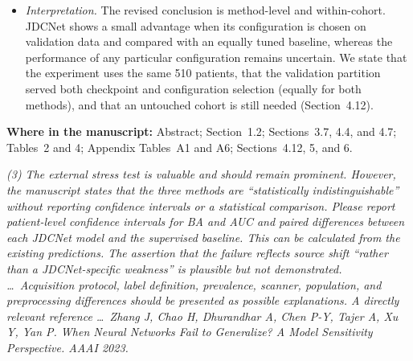 \documentclass[11pt]{article}
\newenvironment{rcomment}{\par\noindent\begin{minipage}{\linewidth}\itshape\color{black!75}}{\end{minipage}\par}
\newcommand{\where}[1]{\par\noindent\textbf{Where in the manuscript:} #1\par}
\begin{document}
\begin{itemize}[leftmargin=1.4em]
\begin{itemize}[leftmargin=1.2em]
    \item \emph{Matched control.} Best-of-16 selection improved the supervised baseline by only $+0.013$ (CI $[-0.011,+0.038]$).
    \item \emph{Training budget.} The batch-size difference identified in our audit is unlikely to explain the result: supervised BA was $0.620$ at batch 128 versus $0.625$ at batch 512.
  \end{itemize}
  \item \emph{Interpretation.} The revised conclusion is method-level and within-cohort. JDCNet shows a small advantage when its configuration is chosen on validation data and compared with an equally tuned baseline, whereas the performance of any particular configuration remains uncertain. We state that the experiment uses the same 510 patients, that the validation partition served both checkpoint and configuration selection (equally for both methods), and that an untouched cohort is still needed (Section~4.12).
\end{itemize}
\where{Abstract; Section~1.2; Sections~3.7, 4.4, and 4.7; Tables~2 and 4; Appendix Tables~A1 and A6; Sections~4.12, 5, and 6.}

\begin{rcomment}
(3) The external stress test is valuable and should remain prominent. However, the manuscript states that the three methods are ``statistically indistinguishable'' without reporting confidence intervals or a statistical comparison. Please report patient-level confidence intervals for BA and AUC and paired differences between each JDCNet model and the supervised baseline. This can be calculated from the existing predictions. The assertion that the failure reflects source shift ``rather than a JDCNet-specific weakness'' is plausible but not demonstrated. \ldots\ Acquisition protocol, label definition, prevalence, scanner, population, and preprocessing differences should be presented as possible explanations. A directly relevant reference \ldots\ Zhang J, Chao H, Dhurandhar A, Chen P-Y, Tajer A, Xu Y, Yan P. When Neural Networks Fail to Generalize? A Model Sensitivity Perspective. AAAI 2023.
\end{rcomment}
\end{document}
